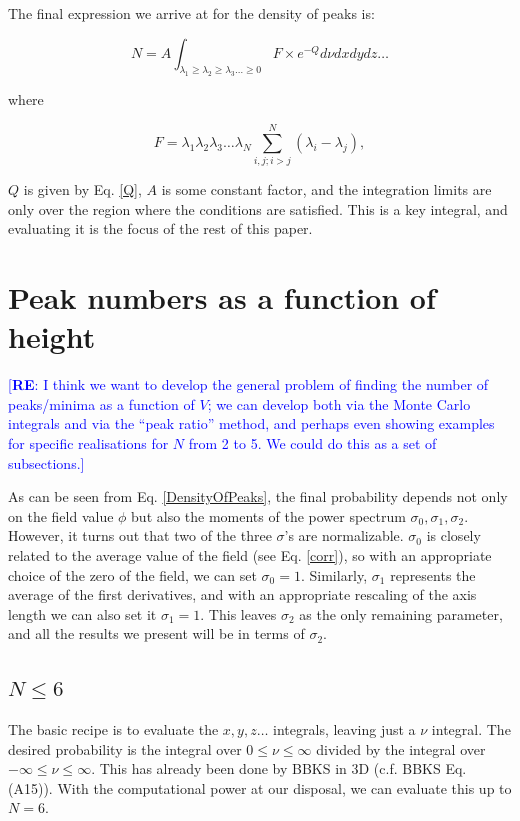 \documentclass[12pt]{article}
\newcommand{\re}[1]{\textcolor{blue}{[{\bf RE}: #1]}}
\begin{document}
The final expression we arrive at for the density of peaks is:

\begin{equation} \label{DensityOfPeaks}
N = A \int_{\lambda_1 \geq \lambda_2 \geq \lambda_3 \ldots \geq 0} F \times e^{-Q} d\nu dx dy dz \ldots
\end{equation}

\noindent where

\begin{equation}
F = \lambda_1\lambda_2\lambda_3\ldots\lambda_N \sum^N_{i,j; i>j} (\lambda_i - \lambda_j),
\end{equation}

\noindent $Q$ is given by Eq. \ref{Q}, $A$ is some constant factor, and the integration limits are only over the region where the conditions are satisfied. This is a key integral, and evaluating it is the focus of the rest of this paper.

\section{Peak numbers as a function of height}

\re{I think we want to develop the general problem of finding the number of peaks/minima as a function of $V$; we can develop both via the Monte Carlo integrals and via the ``peak ratio'' method, and perhaps even showing examples for specific realisations for $N$ from 2 to 5.  We could do this as a set of subsections.}  

As can be seen from Eq. \ref{DensityOfPeaks}, the final probability depends not only on the field value $\phi$ but also the moments of the power spectrum $\sigma_0, \sigma_1, \sigma_2$. However, it turns out that two of the three $\sigma$'s are normalizable. $\sigma_0$ is closely related to the average value of the field (see Eq. \ref{corr}), so with an appropriate choice of the zero of the field, we can set $\sigma_0 = 1$. Similarly, $\sigma_1$ represents the average of the first derivatives, and with an appropriate rescaling of the axis length we can also set it $\sigma_1 = 1$. This leaves $\sigma_2$ as the only remaining parameter, and all the results we present will be in terms of $\sigma_2$.

\subsection{$N \leq 6$}
The basic recipe is to evaluate the $x, y, z \ldots$ integrals, leaving just a $\nu$ integral. The desired probability is the integral over $0 \leq \nu \leq \infty$ divided by the integral over $-\infty \leq \nu \leq \infty$. This has already been done by BBKS in 3D (c.f. BBKS Eq. (A15)). With the computational power at our disposal, we can evaluate this up to $N=6$.
\end{document}
